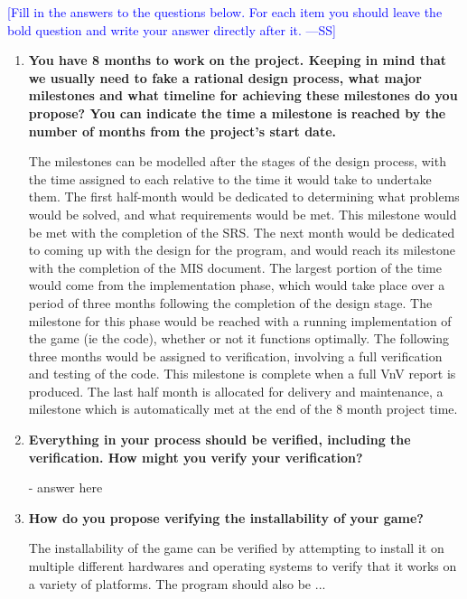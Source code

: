 \documentclass[12pt,fleqn]{examtst}
\newcommand{\authornote}[3]{\textcolor{#1}{[#3 ---#2]}}
\newcommand{\authornote}[3]{}
\newcommand{\wss}[1]{\authornote{blue}{SS}{#1}}
\begin{document}
\noindent \wss{Fill in the answers to the questions below.  For each item you
  should leave the bold question and write your answer directly after it.}

\begin{enumerate}
  
\item \textbf{You have 8 months to work on the project.  Keeping in mind that we
  usually need to fake a rational design process, what major milestones and what
  timeline for achieving these milestones do you propose?  You can indicate the
  time a milestone is reached by the number of months from the project's start date.}

The milestones can be modelled after the stages of the design process, with the time assigned to each relative to the time it would take to undertake them. The first half-month would be dedicated to determining what problems would be solved, and what requirements would be met. This milestone would be met with the completion of the SRS. The next month would be dedicated to coming up with the design for the program, and would reach its milestone with the completion of the MIS document. The largest portion of the time would come from the implementation phase, which would take place over a period of three months following the completion of the design stage. The milestone for this phase would be reached with a running implementation of the game (ie the code), whether or not it functions optimally. The following three months would be assigned to verification, involving a full verification and testing of the code. This milestone is complete when a full VnV report is produced. The last half month is allocated for delivery and maintenance, a milestone which is automatically met at the end of the 8 month project time.
  
\item \textbf{Everything in your process should be verified, including the
    verification.  How might you verify your verification?}

  - answer here
  
\item \textbf{How do you propose verifying the installability of your game?}

The installability of the game can be verified by attempting to install it on multiple different hardwares and operating systems to verify that it works on a variety of platforms. The program should also be ...
  
\end{enumerate}
\end{document}
